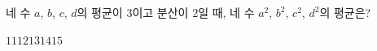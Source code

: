 네 수 $a$, $b$, $c$, $d$의 평균이 $3$이고 분산이 $2$일 때, 네 수 $a^2$, $b^2$, $c^2$, $d^2$의 평균은?
\begin{choices32}{$11$}{$12$}{$13$}{$14$}{$15$}\end{choices32}
